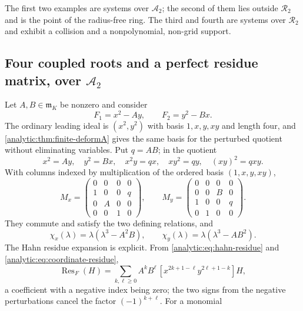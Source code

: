\documentclass[11pt,letterpaper]{article}
\theoremstyle{definition}
\theoremstyle{remark}
\newcommand{\A}{\mathscr A}
\newcommand{\RR}{\mathscr R}
\newcommand{\m}{\mathfrak m}
\newcommand{\Res}{\operatorname{Res}}
\numberwithin{equation}{section}
\begin{document}
The first two examples are systems over $\A_2$; the second of them lies
outside $\RR_2$ and is the point of the radius-free ring. The third and
fourth are systems over $\RR_2$ and exhibit a collision and a
nonpolynomial, non-grid support.

\subsection{Four coupled roots and a perfect residue matrix, over $\A_2$}
\label{analytic:subsec:four-roots}
Let $A,B\in\m_K$ be nonzero and consider
\begin{equation}\label{analytic:eq:four-system}
 F_1=x^2-Ay,\qquad F_2=y^2-Bx .
\end{equation}
The ordinary leading ideal is $(x^2,y^2)$ with basis $1,x,y,xy$ and length
four, and \cref{analytic:thm:finite-deformA} gives the same basis for the
perturbed quotient without eliminating variables. Put $q=AB$; in the
quotient
\[
 x^2=Ay,\quad y^2=Bx,\quad x^2y=qx,\quad xy^2=qy,\quad (xy)^2=qxy .
\]
With columns indexed by multiplication of the ordered basis $(1,x,y,xy)$,
\begin{equation}\label{analytic:eq:example-matrices}
 M_x=\begin{pmatrix}0&0&0&0\\1&0&0&q\\0&A&0&0\\0&0&1&0\end{pmatrix},
 \qquad
 M_y=\begin{pmatrix}0&0&0&0\\0&0&B&0\\1&0&0&q\\0&1&0&0\end{pmatrix}.
\end{equation}
They commute and satisfy the two defining relations, and
\begin{equation}\label{analytic:eq:example-char}
 \chi_x(\lambda)=\lambda(\lambda^3-A^2B),\qquad
 \chi_y(\lambda)=\lambda(\lambda^3-AB^2).
\end{equation}
The Hahn residue expansion is explicit. From
\eqref{analytic:eq:hahn-residue} and
\eqref{analytic:eq:coordinate-residue},
\begin{equation}\label{analytic:eq:example-coeff}
 \Res_F(H)=\sum_{k,\ell\ge0}A^kB^\ell\,[x^{2k+1-\ell}y^{2\ell+1-k}]H ,
\end{equation}
a coefficient with a negative index being zero; the two signs from the
negative perturbations cancel the factor $(-1)^{k+\ell}$. For a monomial
\end{document}

